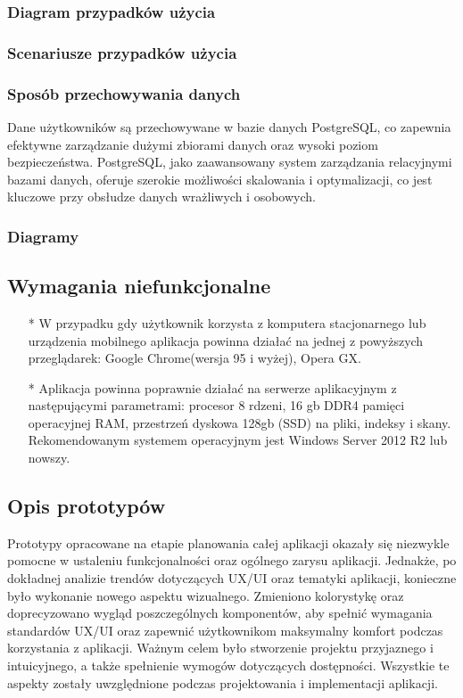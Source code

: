 \subsubsection{Diagram przypadków użycia}

\subsubsection{Scenariusze przypadków użycia}

\subsubsection{Sposób przechowywania danych}
Dane użytkowników są przechowywane w bazie danych PostgreSQL, co zapewnia efektywne zarządzanie dużymi zbiorami danych oraz wysoki poziom bezpieczeństwa. PostgreSQL, jako zaawansowany system zarządzania relacyjnymi bazami danych, oferuje szerokie możliwości skalowania i optymalizacji, co jest kluczowe przy obsłudze danych wrażliwych i osobowych.

\subsubsection{Diagramy}
\clearpage

\subsection{Wymagania niefunkcjonalne}
\begin{itemize}
    \item[*] W przypadku gdy użytkownik korzysta z komputera stacjonarnego lub urządzenia mobilnego aplikacja powinna działać na jednej z powyższych przeglądarek: Google Chrome(wersja 95 i wyżej), Opera GX. 
    \item[*] Aplikacja powinna poprawnie działać na serwerze aplikacyjnym z następującymi parametrami: procesor 8 rdzeni, 16 gb DDR4 pamięci operacyjnej RAM, przestrzeń dyskowa 128gb (SSD) na pliki, indeksy i skany. Rekomendowanym systemem operacyjnym jest Windows Server 2012 R2 lub nowszy.
\end{itemize}
\clearpage

\subsection{Opis prototypów}
Prototypy opracowane na etapie planowania całej aplikacji okazały się niezwykle pomocne w ustaleniu funkcjonalności oraz ogólnego zarysu aplikacji. Jednakże, po dokładnej analizie trendów dotyczących UX/UI oraz tematyki aplikacji, konieczne było wykonanie nowego aspektu wizualnego. Zmieniono kolorystykę oraz doprecyzowano wygląd poszczególnych komponentów, aby spełnić wymagania standardów UX/UI oraz zapewnić użytkownikom maksymalny komfort podczas korzystania z aplikacji. Ważnym celem było stworzenie projektu przyjaznego i intuicyjnego, a także spełnienie wymogów dotyczących dostępności. Wszystkie te aspekty zostały uwzględnione podczas projektowania i implementacji aplikacji.

